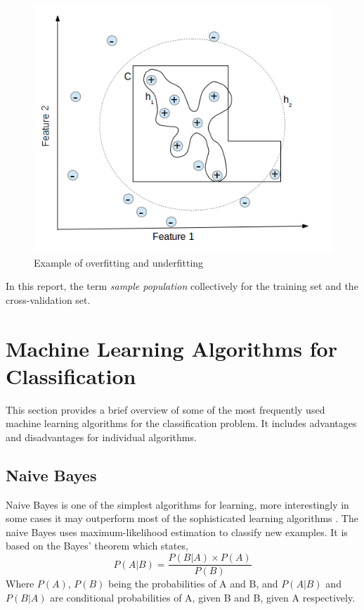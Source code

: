 \begin{figure}[h]
  \begin{center}
    \captionsetup{justification=centering}
    \includegraphics[scale=0.45]{figures/mlfitting.png}
    \caption{Example of overfitting and underfitting}
    \label{fig:mlfitting}
  \end{center}
\end{figure}
In this report, the term \emph{sample population} collectively for the training set and the cross-validation set.

\section{Machine Learning Algorithms for Classification}
\label{sec:c3mlclassification}
This section provides a brief overview of some of the most frequently used machine learning algorithms for the classification problem. It includes advantages and disadvantages for individual algorithms.

\subsection{Naive Bayes}
Naive Bayes is one of the simplest algorithms for learning, more interestingly in some cases it may outperform most of the sophisticated learning algorithms \cite{John1995}. The naive Bayes uses maximum-likelihood estimation to classify new examples. It is based on the Bayes' theorem which states,
\[ P(A|B) = \frac{P(B|A) \times P(A)}{P(B)} \]
Where $P(A)$, $P(B)$ being the probabilities of A and B, and $P(A|B)$ and $P(B|A)$ are conditional probabilities of A, given B and B, given A respectively.
 
